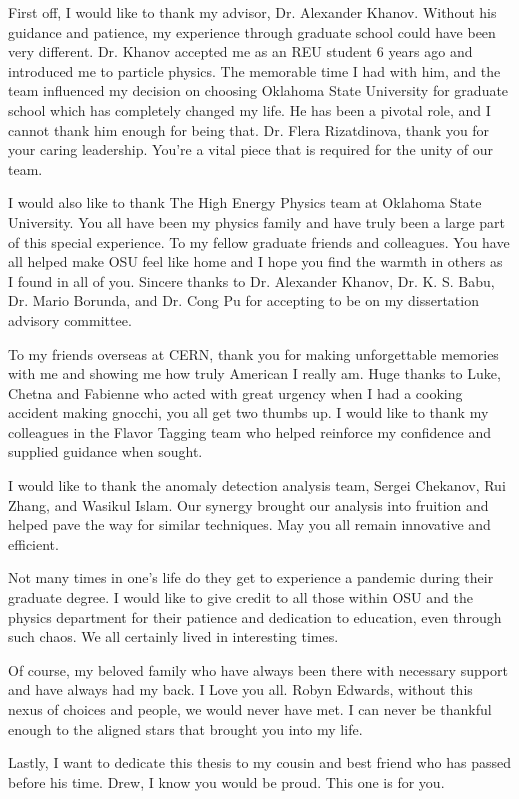 First off, I would like to thank my advisor, Dr. Alexander Khanov. Without his guidance and patience, my experience through 
graduate school could have been very different. Dr. Khanov accepted me as an REU student 6 years ago and introduced me to particle physics.
The memorable time I had with him, and the team influenced my decision on choosing Oklahoma State University for graduate
school which has completely changed my life. He has been a pivotal role, and I cannot thank him enough for being that.
Dr. Flera Rizatdinova, thank you for your caring leadership. You're a vital piece that is required for the unity of our team.
\par
I would also like to thank The High Energy Physics team at Oklahoma State University. You all have been my physics family 
and have truly been a large part of this special experience. To my fellow graduate friends and colleagues. You have all helped 
make OSU feel like home and I hope you find the warmth in others as I found in all of you. 
Sincere thanks to Dr. Alexander Khanov, Dr. K. S. Babu, Dr. Mario Borunda, and Dr. Cong Pu for accepting to be on my dissertation advisory committee.
\par
To my friends overseas at CERN, thank you for making unforgettable memories with me and showing me how truly American I really am. Huge 
thanks to Luke, Chetna and Fabienne who acted with great urgency when I had a cooking accident making gnocchi, you all get two thumbs up. I would 
like to thank my colleagues in the Flavor Tagging team who helped reinforce my confidence and supplied guidance when sought. 
\par
I would like to thank the anomaly detection analysis team, Sergei Chekanov, Rui Zhang, and Wasikul Islam. Our synergy brought 
our analysis into fruition and helped pave the way for similar techniques. May you all remain innovative and efficient. 
\par
Not many times in one's life do they get to experience a pandemic during their graduate degree. I would like to give credit to all those 
within OSU and the physics department for their patience and dedication to education, even through such chaos. We all certainly lived in interesting times. 
\par
Of course, my beloved family who have always been there with necessary support and have always had my back. I Love you all.
Robyn Edwards, without this nexus of choices and people, we would never have met. I can never be thankful enough to the aligned stars 
that brought you into my life.
\par
Lastly, I want to dedicate this thesis to my cousin and best friend who has passed before his time. Drew, I know you would be proud. 
This one is for you. 

